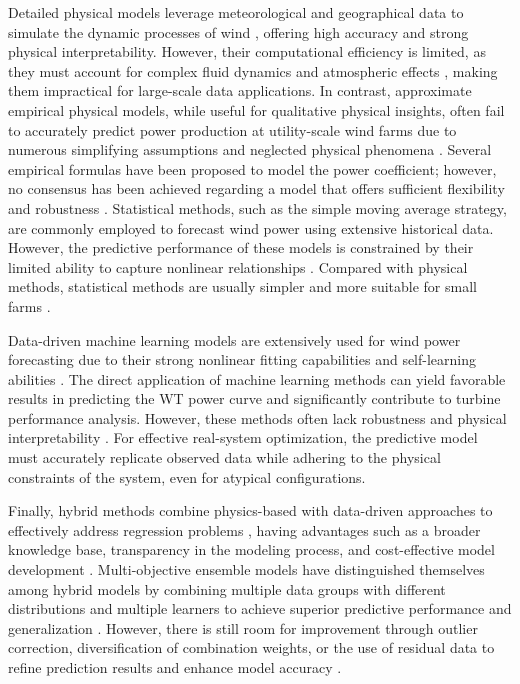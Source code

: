 \documentclass[preprint,12pt]{elsarticle}
\begin{document}
Detailed physical models leverage meteorological and geographical data to simulate the dynamic processes of wind \cite{CHEN2020}, offering high accuracy and strong physical interpretability. However, their computational efficiency is limited, as they must account for complex fluid dynamics and atmospheric effects \cite{Zehtabiyan2022}, making them impractical for large-scale data applications. In contrast, approximate empirical physical models, while useful for qualitative physical insights, often fail to accurately predict power production at utility-scale wind farms due to numerous simplifying assumptions and neglected physical phenomena \cite{Howland2019}. Several empirical formulas have been proposed to model the power coefficient; however, no consensus has been achieved regarding a model that offers sufficient flexibility and robustness \cite{Carpintero2020,Castillo2023}. Statistical methods, such as the simple moving average strategy, are commonly employed to forecast wind power using extensive historical data. However, the predictive performance of these models is constrained by their limited ability to capture nonlinear relationships \cite{ZHU2019}. Compared with physical methods, statistical methods are usually simpler and more suitable for small farms \cite{LIU2010}.

Data-driven machine learning models are extensively used for wind power forecasting due to their strong nonlinear fitting capabilities and self-learning abilities \cite{Clifton2013,HEINERMANN2016,SUN2020,DEMOLLI2019,MOSS2024,Dhungana2025}. The direct application of machine learning methods can yield favorable results in predicting the WT power curve and significantly contribute to turbine performance analysis. However, these methods often lack robustness and physical interpretability \cite{Wang2023}. For effective real-system optimization, the predictive model must accurately replicate observed data while adhering to the physical constraints of the system, even for atypical configurations.

Finally, hybrid methods combine physics-based with data-driven approaches to effectively address regression problems \cite{Stoffel2022}, having advantages such as a broader knowledge base, transparency in the modeling process, and cost-effective model development \cite{VONSTOSCH2014}. Multi-objective ensemble models have distinguished themselves among hybrid models by combining multiple data groups with different distributions and multiple learners to achieve superior predictive performance and generalization \cite{TASCIKARAOGLU2014,LIU2020}. However, there is still room for improvement through outlier correction, diversification of combination weights, or the use of residual data to refine prediction results and enhance model accuracy \cite{CHEN2022,YIN2022}. 
\end{document}
